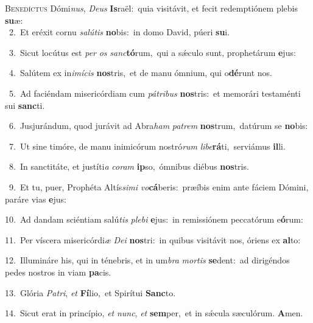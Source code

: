 \lettrine{\initial\textcolor{\initialcolor}{B}}{enedíctus} Dómi\-\textit{nus}\-, \textit{De}\-\textit{us} \textbf{Is}\-raël:~\star quia visitávit, et fecit redemptiónem plebis \textbf{su}\-æ:\\
{\numbfont\textcolor{\numbcolor}{~2.}}~Et eréxit cornu \textit{sa}\-\textit{lú}\textit{tis} \textbf{no}\-bis:~\star in domo David, púeri \textbf{su}\-i.\par
{\numbfont\textcolor{\numbcolor}{~3.}}~Sicut locútus est \textit{per} \textit{os} \textit{sanc}\-\textbf{tó}rum,~\star qui a sǽculo sunt, prophetárum \textbf{e}\-jus:\par
{\numbfont\textcolor{\numbcolor}{~4.}}~Salútem ex in\-\textit{i}\-\textit{mí}\textit{cis} \textbf{nos}\-tris,~\star et de manu ómnium, qui o\-\textbf{dé}\-runt nos.\par
{\numbfont\textcolor{\numbcolor}{~5.}}~Ad faciéndam misericórdiam cum \textit{pá}\-\textit{tri}\textit{bus} \textbf{nos}\-tris:~\star et memorári testaménti sui \textbf{sanc}\-ti.\par
{\numbfont\textcolor{\numbcolor}{~6.}}~Jusjurándum, quod jurávit ad Abra\textit{ham} \textit{pa}\-\textit{trem} \textbf{nos}\-trum,~\star datúrum se \textbf{no}\-bis:\par
{\numbfont\textcolor{\numbcolor}{~7.}}~Ut sine timóre, de manu inimicórum nostró\textit{rum} \textit{li}\-\textit{be}\textbf{rá}ti,~\star serviámus \textbf{il}\-li.\par
{\numbfont\textcolor{\numbcolor}{~8.}}~In sanctitáte, et justíti\textit{a} \textit{co}\-\textit{ram} \textbf{ip}\-so,~\star ómnibus diébus \textbf{nos}\-tris.\par
{\numbfont\textcolor{\numbcolor}{~9.}}~Et tu, puer, Prophéta Altís\-\textit{si}\-\textit{mi} \textit{vo}\-\textbf{cá}beris:~\star præíbis enim ante fáciem Dómini, paráre vias \textbf{e}\-jus:\par
{\numbfont\textcolor{\numbcolor}{10.}}~Ad dandam sciéntiam salú\textit{tis} \textit{ple}\-\textit{bi} \textbf{e}\-jus:~\star in remissiónem peccatórum e\-\textbf{ó}\-rum:\par
{\numbfont\textcolor{\numbcolor}{11.}}~Per víscera misericórdi\textit{æ} \textit{De}\-\textit{i} \textbf{nos}\-tri:~\star in quibus visitávit nos, óriens ex \textbf{al}\-to:\par
{\numbfont\textcolor{\numbcolor}{12.}}~Illumináre his, qui in ténebris, et in um\textit{bra} \textit{mor}\-\textit{tis} \textbf{se}\-dent:~\star ad dirigéndos pedes nostros in viam \textbf{pa}\-cis.\par
{\numbfont\textcolor{\numbcolor}{13.}}~Glória \textit{Pa}\-\textit{tri}, \textit{et} \textbf{Fí}\-lio,~\star et Spirítui \textbf{Sanc}\-to.\par
{\numbfont\textcolor{\numbcolor}{14.}}~Sicut erat in princípio, \textit{et} \textit{nunc}\-, \textit{et} \textbf{sem}\-per,~\star et in sǽcula sæculórum. \textbf{A}\-men.\par
